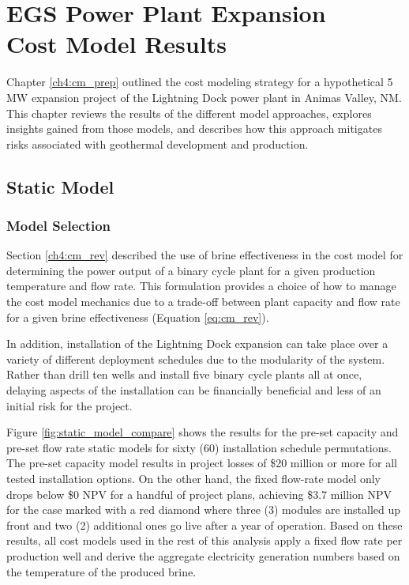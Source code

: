 \chapter{EGS Power Plant Expansion\\Cost Model Results}\label{ch6:cm_results}
Chapter \ref{ch4:cm_prep} outlined the cost modeling strategy for a hypothetical 5 MW expansion project of the Lightning Dock power plant in Animas Valley, NM. This chapter reviews the results of the different model approaches, explores insights gained from those models, and describes how this approach mitigates risks associated with geothermal development and production.

\section{Static Model}\label{ch6:static_mod}
\subsection{Model Selection}\label{ch6:static_select}
Section \ref{ch4:cm_rev} described the use of brine effectiveness in the cost model for determining the power output of a binary cycle plant for a given production temperature and flow rate. This formulation provides a choice of how to manage the cost model mechanics due to a trade-off between plant capacity and flow rate for a given brine effectiveness (Equation \ref{eq:cm_rev}).

In addition, installation of the Lightning Dock expansion can take place over a variety of different deployment schedules due to the modularity of the system. Rather than drill ten wells and install five binary cycle plants all at once, delaying aspects of the installation can be financially beneficial and less of an initial risk for the project.

Figure \ref{fig:static_model_compare} shows the results for the pre-set capacity and pre-set flow rate static models for sixty (60) installation schedule permutations. The pre-set capacity model results in project losses of \$20 million or more for all tested installation options. On the other hand, the fixed flow-rate model only drops below \$0 NPV for a handful of project plans, achieving \$3.7 million NPV for the case marked with a red diamond where three (3) modules are installed up front and two (2) additional ones go live after a year of operation. Based on these results, all cost models used in the rest of this analysis apply a fixed flow rate per production well and derive the aggregate electricity generation numbers based on the temperature of the produced brine.

